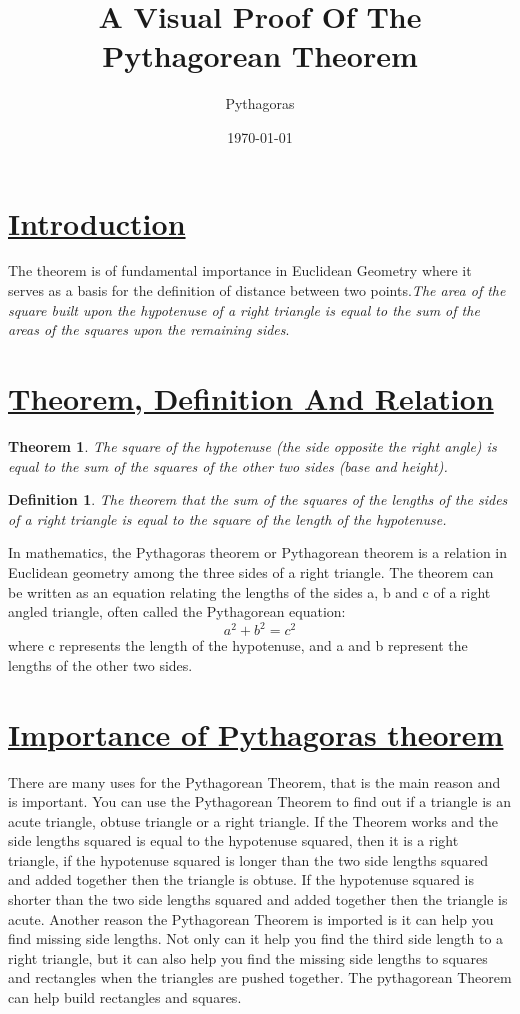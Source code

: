 \documentclass[10pt]{article}
\title{A Visual Proof Of The Pythagorean Theorem}
\author{Pythagoras}
\date{\today}
\begin{document}
\maketitle
\section{\underline{Introduction}}
\label{sec:intro}
The theorem is of fundamental importance in Euclidean Geometry where it serves as a basis for the definition of distance between two points.\emph{The area of the square built upon the hypotenuse of a right triangle is equal to the sum of the areas of the squares upon the remaining sides}.
\section{\underline{Theorem, Definition And Relation}}
\label{sec:def}
\newtheorem{mydef}{Theorem}[section]
\begin{mydef}
The square of the hypotenuse (the side opposite the right angle) is equal to the sum of the squares of the other two sides (base and height).
\end{mydef}
\newtheorem{mydef2}{Definition}[section]
\begin{mydef2}
The theorem that the sum of the squares of the lengths of the sides of a right triangle is equal to the square of the length of the hypotenuse.
\end{mydef2}
In mathematics, the Pythagoras theorem or Pythagorean theorem is a relation in Euclidean geometry among the three sides of a right triangle. The theorem can be written as an equation relating the lengths of the sides a, b and c of a right angled triangle, often called the Pythagorean equation:
\begin{equation}
\label{one}
a^2+b^2=c^2
\end{equation}
where c represents the length of the hypotenuse, and a and b represent the lengths of the other two sides.


\section{\underline{Importance of Pythagoras theorem}}
\label{sec:importance}

There are many uses for the Pythagorean Theorem, that is the main reason and is important. You can use the Pythagorean Theorem to find out if a triangle is an acute triangle, obtuse triangle or a right triangle. If the Theorem works and the side lengths squared is equal to the hypotenuse squared, then it is a right triangle, if the hypotenuse squared is longer than the two side lengths squared and added together then the triangle is obtuse. If the hypotenuse squared is shorter than the two side lengths squared and added together then the triangle is acute.\newline
Another reason the Pythagorean Theorem is imported is it can help you find missing side lengths. Not only can it help you find the third side length to a right triangle, but it can also help you find the missing side lengths to squares and rectangles when the triangles are pushed together. The pythagorean Theorem can help build rectangles and squares.
\end{document}
